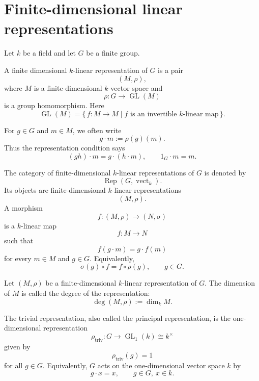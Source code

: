 \section{Finite-dimensional linear representations}

Let \(k\) be a field and let \(G\) be a finite group.

\begin{definition}
    A finite dimensional \(k\)-linear representation of \(G\) is a pair
    \[
        (M,\rho),
    \]
    where \(M\) is a finite-dimensional \(k\)-vector space and
    \[
        \rho:G\longrightarrow \operatorname{GL}(M)
    \]
    is a group homomorphism. Here
    \[
        \operatorname{GL}(M)
        =
        \{\,f:M\to M\mid f \text{ is an invertible } k\text{-linear map}\,\}.
    \]
\end{definition}

For \(g\in G\) and \(m\in M\), we often write
\[
    g\cdot m:=\rho(g)(m).
\]
Thus the representation condition says
\[
    (gh)\cdot m=g\cdot(h\cdot m),
    \qquad
    1_G\cdot m=m.
\]

\begin{definition}
    The category of finite-dimensional \(k\)-linear representations of \(G\) is
    denoted by
    \[
        \operatorname{Rep}(G,\operatorname{vect}_k).
    \]
    Its objects are finite-dimensional \(k\)-linear representations
    \[
        (M,\rho).
    \]
    A morphism
    \[
        f:(M,\rho)\longrightarrow (N,\sigma)
    \]
    is a \(k\)-linear map
    \[
        f:M\longrightarrow N
    \]
    such that
    \[
        f(g\cdot m)=g\cdot f(m)
    \]
    for every \(m\in M\) and \(g\in G\). Equivalently,
    \[
        \sigma(g)\circ f=f\circ \rho(g),
        \qquad g\in G.
    \]
\end{definition}

\begin{definition}[Degree]
    Let \((M,\rho)\) be a finite-dimensional \(k\)-linear representation of \(G\).
    The dimension of \(M\) is called the degree of the representation:
    \[
        \deg(M,\rho):=\dim_k M.
    \]
\end{definition}

\begin{example}
    The trivial representation, also called the principal representation, is the
    one-dimensional representation
    \[
        \rho_{\operatorname{triv}}:G\longrightarrow \operatorname{GL}_1(k)
        \cong k^\times
    \]
    given by
    \[
        \rho_{\operatorname{triv}}(g)=1
    \]
    for all \(g\in G\). Equivalently, \(G\) acts on the one-dimensional vector
    space \(k\) by
    \[
        g\cdot x=x,
        \qquad g\in G,\ x\in k.
    \]
\end{example}

